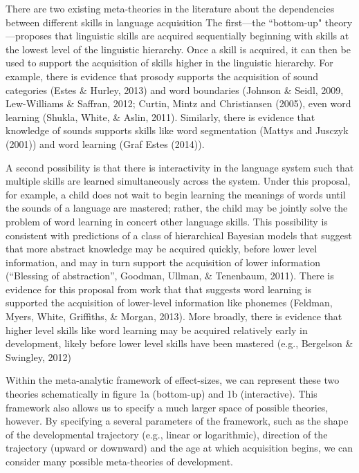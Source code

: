 \documentclass[english,floatsintext,man]{apa6}
\begin{document}
There are two existing meta-theories in the literature about the
dependencies between different skills in language acquisition The
first---the ``bottom-up" theory---proposes that linguistic skills are
acquired sequentially beginning with skills at the lowest level of the
linguistic hierarchy. Once a skill is acquired, it can then be used to
support the acquisition of skills higher in the linguistic hierarchy.
For example, there is evidence that prosody supports the acquisition of
sound categories (Estes \& Hurley, 2013) and word boundaries (Johnson \&
Seidl, 2009, Lew-Williams \& Saffran, 2012; Curtin, Mintz and
Christiansen (2005), even word learning (Shukla, White, \& Aslin, 2011).
Similarly, there is evidence that knowledge of sounds supports skills
like word segmentation (Mattys and Jusczyk (2001)) and word learning
(Graf Estes (2014)).

A second possibility is that there is interactivity in the language
system such that multiple skills are learned simultaneously across the
system. Under this proposal, for example, a child does not wait to begin
learning the meanings of words until the sounds of a language are
mastered; rather, the child may be jointly solve the problem of word
learning in concert other language skills. This possibility is
consistent with predictions of a class of hierarchical Bayesian models
that suggest that more abstract knowledge may be acquired quickly,
before lower level information, and may in turn support the acquisition
of lower information (``Blessing of abstraction'', Goodman, Ullman, \&
Tenenbaum, 2011). There is evidence for this proposal from work that
that suggests word learning is supported the acquisition of lower-level
information like phonemes (Feldman, Myers, White, Griffiths, \& Morgan,
2013). More broadly, there is evidence that higher level skills like
word learning may be acquired relatively early in development, likely
before lower level skills have been mastered (e.g., Bergelson \&
Swingley, 2012)

Within the meta-analytic framework of effect-sizes, we can represent
these two theories schematically in figure 1a (bottom-up) and 1b
(interactive). This framework also allows us to specify a much larger
space of possible theories, however. By specifying a several parameters
of the framework, such as the shape of the developmental trajectory
(e.g., linear or logarithmic), direction of the trajectory (upward or
downward) and the age at which acquisition begins, we can consider many
possible meta-theories of development.
\end{document}
